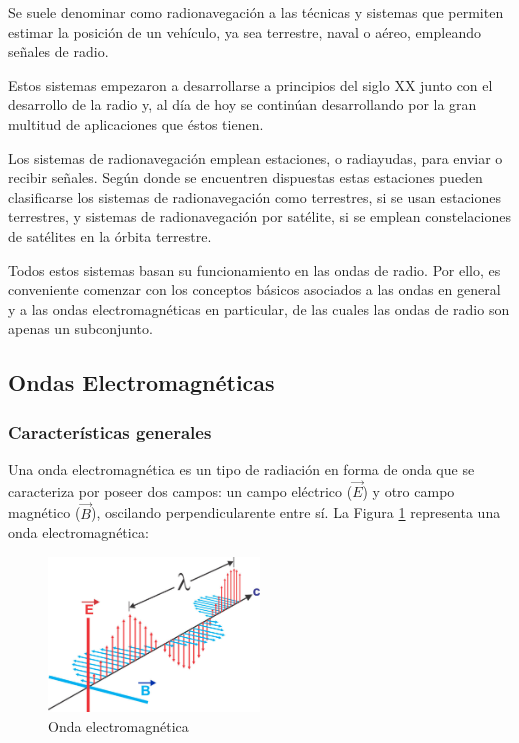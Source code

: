 Se suele denominar como radionavegaci\'on a las t\'ecnicas y sistemas que permiten estimar la posici\'on de un veh\'iculo, ya sea terrestre, naval o a\'ereo, empleando se\~nales de radio.

Estos sistemas empezaron a desarrollarse a principios del siglo XX junto con el desarrollo de la radio y, al día de hoy se contin\'uan desarrollando por la gran multitud de aplicaciones que éstos tienen.

Los sistemas de radionavegación emplean estaciones, o radiayudas, para enviar o recibir señales. Seg\'un  donde se encuentren dispuestas estas estaciones pueden clasificarse los sistemas de radionavegación como terrestres, si se usan estaciones terrestres, y sistemas de radionavegación por satélite, si se emplean constelaciones de satélites en la \'orbita terrestre.

Todos estos sistemas basan su funcionamiento en las ondas de radio.
 Por ello, es conveniente comenzar con los conceptos b\'asicos asociados a las ondas en general y a las ondas electromagn\'eticas en particular, de las cuales las ondas de radio son apenas un subconjunto.

\subsection{ Ondas Electromagn\'eticas }
\label{sec:06.ondas.electromagneticas}


\subsubsection{Caracter\'isticas generales}
\label{sec:06.ondas.electromagneticas.caracteristicas.generales}

Una onda electromagn\'etica es un tipo de radiaci\'on en forma de onda que se caracteriza por poseer dos campos: un campo el\'ectrico ($\vec{E}$) y otro campo magn\'etico ($\vec{B}$), oscilando perpendicularente entre s\'i. La Figura \ref{fig:onda-electromagnetica} representa una onda electromagn\'etica: 

\begin{figure}[!h]
  \centering
  \includegraphics[width=0.5\textwidth]{06.radionavegacion/Imagenes/06.00.ondas.electromagneticas/onda_electromagnetica.jpg}  
  \caption{Onda electromagn\'etica \protect\cite{onda_electro_magnetica}}
  \label{fig:onda-electromagnetica}
\end{figure}



